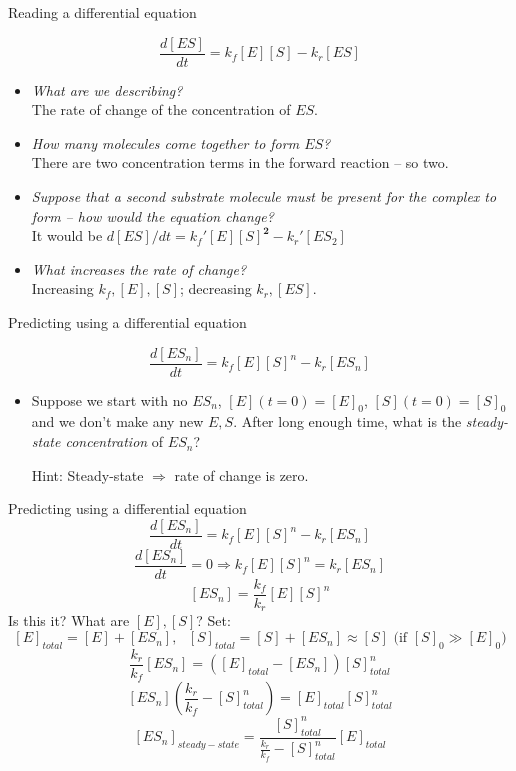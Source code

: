 \documentclass[handout]{beamer} %
\begin{document}
\begin{frame}{Reading a differential equation}

$$ \frac{d[ES]}{dt} = k_f [E][S] - k_r[ES] $$

\begin{itemize}
	\item \emph{What are we describing?}\\ \pause
	The rate of change of the concentration of $ES$. \pause
	\item \emph{How many molecules come together to form $ES$?}\\ \pause
	There are two concentration terms in the forward reaction -- so two. \pause
	\item \emph{Suppose that a second substrate molecule must be present for the complex to form -- how would the equation change?}\\ \pause
	It would be $ d[ES]/dt = k_f'[E][S]^\mathbf{2} - k_r'[ES_2] $\pause
	\item \emph{What increases the rate of change?}\\ \pause
	Increasing $k_f, [E], [S]$; decreasing $k_r, [ES]$. \pause
\end{itemize}

\end{frame}

\begin{frame}{Predicting using a differential equation}

$$ \frac{d[ES_n]}{dt} = k_f [E][S]^n - k_r[ES_n] $$

\begin{itemize}

	\item Suppose we start with no $ES_n$, $[E](t = 0) = [E]_0$, $[S](t = 0) = [S]_0$ and we don't make any new $E, S$. After long enough time, what is the \emph{steady-state concentration} of $ES_n$? \pause
	
	\vspace{3 mm}
	
	Hint: Steady-state $\Rightarrow$ rate of change is zero. \pause

\end{itemize}

\end{frame}


\begin{frame}{Predicting using a differential equation}
	$$ \frac{d[ES_n]}{dt} = k_f [E][S]^n - k_r[ES_n] $$
	$$ \frac{d[ES_n]}{dt} = 0 \Rightarrow k_f[E][S]^n = k_r[ES_n] $$ \pause
	$$ [ES_n] = \frac{k_f}{k_r} [E][S]^n $$ \pause
	Is this it? \pause What are $[E], [S]$? \pause Set:
	$$ [E]_{total} = [E] + [ES_n], ~~~ [S]_{total} = [S] + [ES_n] \approx [S] \text{ (if } [S]_0 \gg [E]_0) $$ \pause %
	\vspace{-2.5mm}
	$$ \frac{k_r}{k_f} [ES_n] = ([E]_{total} - [ES_n])[S]_{total}^n $$ \pause
	$$ [ES_n] \left ( \frac{k_r}{k_f} - [S]_{total}^n \right ) = [E]_{total} [S]_{total}^n $$ \pause
	$$ \boxed{ [ES_n]_{steady-state} = \frac{[S]_{total}^n}{\frac{k_r}{k_f} - [S]_{total}^n} [E]_{total} }$$
\end{frame}
\end{document}
